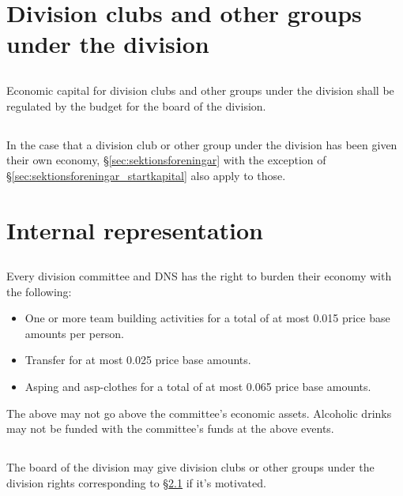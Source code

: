 \documentclass[a4paper]{dtek}
\begin{document}
\section{Division clubs and other groups under the division}
\subsection{}
Economic capital for division clubs and other groups under the division shall be regulated by the budget for the board of the division.
\subsection{}
In the case that a division club or other group under the division has been given their own economy, §\ref{sec:sektionsforeningar} with the exception of §\ref{sec:sektionsforeningar_startkapital} also apply to those.

\section{Internal representation}
\subsection{}
\label{sec:internreps}
Every division committee and DNS has the right to burden their economy with the following: 
\begin{itemize}
    \item One or more team building activities for a total of at most 0.015 price base amounts per person.
    \item Transfer for at most 0.025 price base amounts.
    \item Asping and asp-clothes for a total of at most 0.065 price base amounts.
\end{itemize}
The above may not go above the committee's economic assets. Alcoholic drinks may not be funded with the committee's funds at the above events.

\subsection{}
The board of the division may give division clubs or other groups under the division rights corresponding to §\ref{sec:internreps} if it's motivated.

\end{document}
